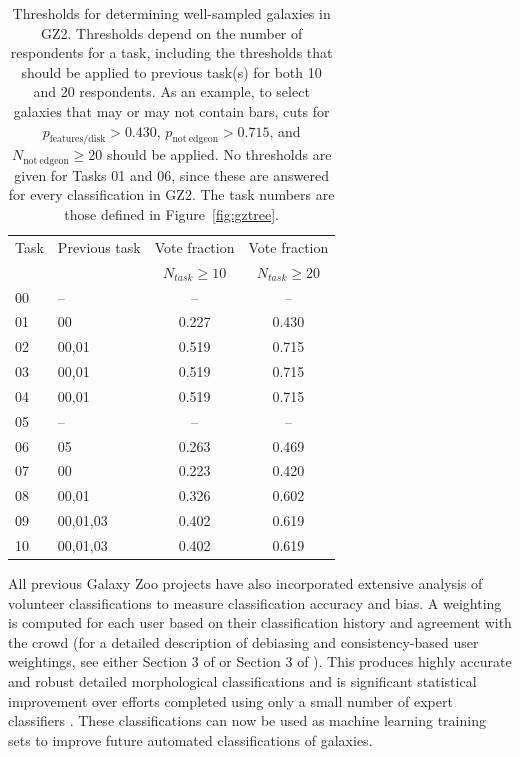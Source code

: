 \begin{table}
\centering
 \begin{tabular*}{\textwidth}{l@{\extracolsep{\fill}}lcc}
 \hline
\multicolumn{1}{l}{Task} &
\multicolumn{1}{l}{Previous task} &
\multicolumn{1}{c}{Vote fraction} &
\multicolumn{1}{c}{Vote fraction}
\\ 
\multicolumn{1}{l}{} &
\multicolumn{1}{l}{} &
\multicolumn{1}{c}{$N_{task}\geq10$} &
\multicolumn{1}{c}{$N_{task}\geq20$}
\\ 
\hline					
00                      & --        & --        & --        \\
01                      & 00        & 0.227     & 0.430     \\
02                      & 00,01     & 0.519     & 0.715     \\
03                      & 00,01     & 0.519     & 0.715     \\
04                      & 00,01     & 0.519     & 0.715     \\
05                      & --        & --        & --        \\
06                      & 05        & 0.263     & 0.469     \\
07                      & 00        & 0.223     & 0.420     \\
08                      & 00,01     & 0.326     & 0.602     \\
09                      & 00,01,03  & 0.402     & 0.619     \\
10                      & 00,01,03  & 0.402     & 0.619     \\
\hline
\end{tabular*}
\caption[Thresholds for selecting sub-samples of galaxies using GZ2 data]{Thresholds for determining well-sampled galaxies in GZ2. Thresholds depend on the number of respondents for a task, including the thresholds that should be applied to previous task(s) for both 10 and 20 respondents. As an example, to select galaxies that may or may not contain bars, cuts for $p_\mathrm{features/disk}>0.430$, $p_\mathrm{not~edgeon}>0.715$, and $N_\mathrm{not~edgeon}\geq20$ should be applied. No thresholds are given for Tasks 01 and 06, since these are answered for every classification in GZ2. The task numbers are those defined in Figure~\ref{fig:gztree}.}
\label{table:votes}
\end{table}

All previous Galaxy Zoo projects have also incorporated extensive analysis of volunteer classifications to measure classification accuracy and bias. A weighting is computed for each user based on their classification history and agreement with the crowd (for a detailed description of debiasing and consistency-based user weightings, see either Section 3 of \citealt{Lintott09} or Section 3 of \citealt{GZ2}). This produces highly accurate and robust detailed morphological classifications and is significant statistical improvement over efforts completed using only a small number of expert classifiers \citep{schawinski07, nair10b, ann15}. These classifications can now be used as machine learning training sets \citep{dieleman15} to improve future automated classifications of galaxies. 

